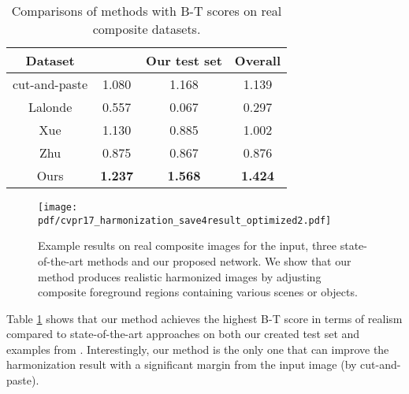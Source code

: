 \documentclass[10pt,twocolumn,letterpaper]{article}
\begin{document}
\begin{table}[t]
	\caption{Comparisons of methods with B-T scores on real composite datasets.
	}
	\vspace{1mm}
	\small
	\centering
	\renewcommand{\arraystretch}{1.5}
	\setlength{\tabcolsep}{10pt}     
	\begin{tabular}{|c|c|c|c|}
		\hline
		Dataset & \cite{Xue_siggraph_2012} & Our test set & Overall \\
		\hline
		\hline
		\vspace{-2mm}
		
		cut-and-paste & 1.080 & 1.168 & 1.139 \\
		\vspace{-2mm}
		
		Lalonde \cite{Lalonde_ICCV_2007} & 0.557 & 0.067 & 0.297 \\
		\vspace{-2mm}
		
		Xue \cite{Xue_siggraph_2012} & 1.130 & 0.885 & 1.002 \\
		\vspace{-2mm}
		
		Zhu \cite{Zhu_ICCV_2015} & 0.875 & 0.867 & 0.876 \\
		
		Ours & \textbf{1.237} & \textbf{1.568} &  \textbf{1.424} \\
		
		\hline
	\end{tabular}
	\label{tab:real}
	\vspace{-3mm}
\end{table}
%
%
\begin{figure*}[t]
	\centering
	\texttt{[image: pdf/cvpr17\_harmonization\_save4result\_optimized2.pdf]}
	\caption{Example results on real composite images for the input, three state-of-the-art methods and our proposed network.
		We show that our method produces realistic harmonized images by adjusting composite foreground regions containing various scenes or objects.
	}
	\label{fig:real}
	\vspace{2mm}
\end{figure*}
%

Table \ref{tab:real} shows that our method achieves the highest B-T score in terms of realism compared to state-of-the-art approaches on both our created test set and examples from \cite{Xue_siggraph_2012}.
%
Interestingly, our method is the only one that can improve the harmonization result with a significant margin from the input image (by cut-and-paste).
%
\end{document}
